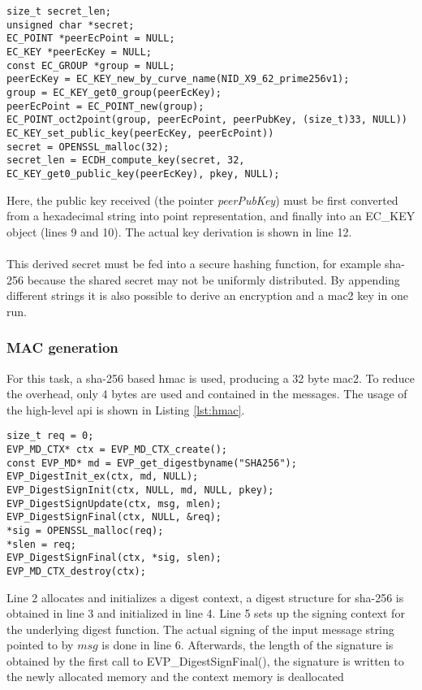 \begin{lstlisting}[style=cStyle,caption={Deriving a shared secret},label=lst:derive]
size_t secret_len;
unsigned char *secret;
EC_POINT *peerEcPoint = NULL;
EC_KEY *peerEcKey = NULL;
const EC_GROUP *group = NULL;
peerEcKey = EC_KEY_new_by_curve_name(NID_X9_62_prime256v1);       
group = EC_KEY_get0_group(peerEcKey);
peerEcPoint = EC_POINT_new(group);
EC_POINT_oct2point(group, peerEcPoint, peerPubKey, (size_t)33, NULL))
EC_KEY_set_public_key(peerEcKey, peerEcPoint))
secret = OPENSSL_malloc(32);
secret_len = ECDH_compute_key(secret, 32, EC_KEY_get0_public_key(peerEcKey), pkey, NULL);
\end{lstlisting}
Here, the public key received (the pointer \textit{peerPubKey}) must be first converted from a hexadecimal string into point representation, and finally into an EC\_KEY object
(lines 9 and 10). The actual key derivation is shown in line 12.
\\
\\
This derived secret must be fed into a secure hashing function, for example \gls{sha}-256 because the shared secret may not be uniformly distributed. By appending different strings
it is also possible to derive an encryption and a \gls{mac2} key in one run.

\subsubsection{MAC generation}
For this task, a \gls{sha}-256 based \gls{hmac} is used, producing a 32 byte \gls{mac2}. To reduce the overhead, only 4 bytes are used and contained in the messages. The usage of
the high-level \gls{api} is shown in Listing \ref{lst:hmac}.
\begin{lstlisting}[style=cStyle,caption={Generating a \gls{hmac}},label=lst:hmac]
size_t req = 0;
EVP_MD_CTX* ctx = EVP_MD_CTX_create();
const EVP_MD* md = EVP_get_digestbyname("SHA256");
EVP_DigestInit_ex(ctx, md, NULL);
EVP_DigestSignInit(ctx, NULL, md, NULL, pkey);
EVP_DigestSignUpdate(ctx, msg, mlen);
EVP_DigestSignFinal(ctx, NULL, &req);
*sig = OPENSSL_malloc(req);
*slen = req;
EVP_DigestSignFinal(ctx, *sig, slen);
EVP_MD_CTX_destroy(ctx);
\end{lstlisting}
Line 2 allocates and initializes a digest context, a digest structure for \gls{sha}-256 is obtained in line 3 and initialized in line 4. Line 5 sets up the signing context for the
underlying digest function. The actual signing of the input message string pointed to by $msg$ is done in line 6. Afterwards, the length of the signature is obtained by the first call
to EVP\_DigestSignFinal(), the signature is written to the newly allocated memory and the context memory is deallocated

